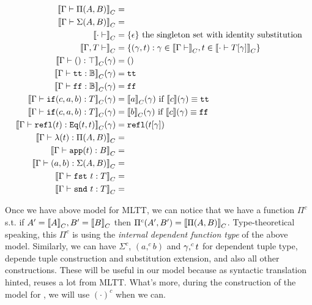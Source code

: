 \begin{align*}
  {{\llbracket {\ensuremath{ {\Gamma} \vdash {\ensuremath{\Pi({A},{B})}} }} \rrbracket}_C} &= \\
  {{\llbracket {\ensuremath{ {\Gamma} \vdash {\ensuremath{\Sigma({A},{B})}} }} \rrbracket}_C} &= \\
  {{\llbracket {\ensuremath{ {\cdot} \vdash }} \rrbracket}_C} &= \{\epsilon\} \text{  the singleton set with identity substitution} \\ 
  {{\llbracket {\ensuremath{ {\Gamma, T} \vdash }} \rrbracket}_C} &= \{ (\gamma , t) : \gamma \in {{\llbracket {\ensuremath{ {\Gamma} \vdash }} \rrbracket}_C}, t \in {{\llbracket {\ensuremath{ {\cdot} \vdash {\ensuremath{{T}\!\left[{\gamma}\right]}} }} \rrbracket}_C}  \} \\
  {{\llbracket {\ensuremath{ {\Gamma} \vdash {\ensuremath{()}} : {\top} }} \rrbracket}_C}(\gamma) &= ()\\
  {{\llbracket {\ensuremath{ {\Gamma} \vdash {\ensuremath{\texttt{tt}}} : {\mathbb{B}} }} \rrbracket}_C}(\gamma) &= \texttt{tt} \\
  {{\llbracket {\ensuremath{ {\Gamma} \vdash {\ensuremath{\texttt{ff}}} : {\mathbb{B}} }} \rrbracket}_C}(\gamma) &= \texttt{ff} \\
  {{\llbracket {\ensuremath{ {\Gamma} \vdash {\ensuremath{\texttt{if}({c},{a},{b})}} : {T} }} \rrbracket}_C}(\gamma) &= {{\llbracket {a} \rrbracket}_C}(\gamma) \text{ if } \llbracket {c} \rrbracket(\gamma) \equiv \texttt{tt} \\
  {{\llbracket {\ensuremath{ {\Gamma} \vdash {\ensuremath{\texttt{if}({c},{a},{b})}} : {T} }} \rrbracket}_C}(\gamma) &= {{\llbracket {b} \rrbracket}_C}(\gamma) \text{ if } \llbracket {c} \rrbracket(\gamma) \equiv \texttt{ff} \\
  {{\llbracket {\ensuremath{ {\Gamma} \vdash {\ensuremath{\texttt{refl}({t})}} : {\texttt{Eq}({t},{t})} }} \rrbracket}_C}(\gamma) &= \texttt{refl}({{t}\!\left[{\gamma}\right]})\\
  {{\llbracket {\ensuremath{ {\Gamma} \vdash {\ensuremath{\lambda({t})}} : {\Pi({A},{B})} }} \rrbracket}_C} &= \\
  {{\llbracket {\ensuremath{ {\Gamma} \vdash {\ensuremath{\texttt{app}({t})}} : {B} }} \rrbracket}_C} &= \\
  {{\llbracket {\ensuremath{ {\Gamma} \vdash {\ensuremath{({a},{b})}} : {\Sigma({A},{B})} }} \rrbracket}_C} &= \\
  {{\llbracket {\ensuremath{ {\Gamma} \vdash {\ensuremath{\texttt{fst}~{t}}} : {T} }} \rrbracket}_C} &= \\
  {{\llbracket {\ensuremath{ {\Gamma} \vdash {\ensuremath{\texttt{snd}~{t}}} : {T} }} \rrbracket}_C} &= \\
\end{align*}

\newcommand{\Glued}[1]{\ensuremath{{#1}^c}}
\newcommand{\GluedPi}[2]{\ensuremath{\Pi^c({#1},{#2})}}
\newcommand{\GSubstExt}[2]{\ensuremath{{#1},^c{#2}}}
\newcommand{\Gpair}[2]{\ensuremath{({#1},^c{#2})}}
\newcommand{\Gfst}[1]{\ensuremath{\texttt{fst}^c~{#1}}}
\newcommand{\Gsnd}[1]{\ensuremath{\texttt{snd}^c~{#1}}}
\newcommand{\Gsub}[2]{\ensuremath{{#1}\!\left[{#2}\right]^c}}
\newcommand{\Gapp}[1]{\ensuremath{\texttt{app}^c({#1})}}
\newcommand{\GSubstWeak}[1]{\ensuremath{(\texttt{p}^c)^{#1}}}
\newcommand{\GLSigAdd}[3]{\ensuremath{\nu^{+c}({#1},{#2},{#3})}}
\newcommand{\GCaseSig}[3]{\ensuremath{\texttt{CaseTy}^c({#1},{#2},{#3})}}

Once we have above model for MLTT, we can notice that we have a function $\Glued{\Pi}$ s.t. if $A' = {{\llbracket {A} \rrbracket}_C}, B' = {{\llbracket {B} \rrbracket}_C}$ then $\GluedPi{A'}{B'} = \denotesC{\TyPi{A}{B}}$. Type-theoretical speaking, this $\Glued{\Pi}$ is using the \emph{internal dependent function type} of the above model. Similarly, we can have $\Glued{\Sigma}$, $\Gpair{a}{b}$  and $\GSubstExt{\gm}{t}$  for dependent tuple type, depende tuple construction and substitution extension, and also all other constructions. These will be useful in our \TT model because as syntactic translation hinted, \TT reuses a lot from MLTT. What's more, during the construction of the model for \TT, we will use $\Glued{(\cdot)}$ when we can.

